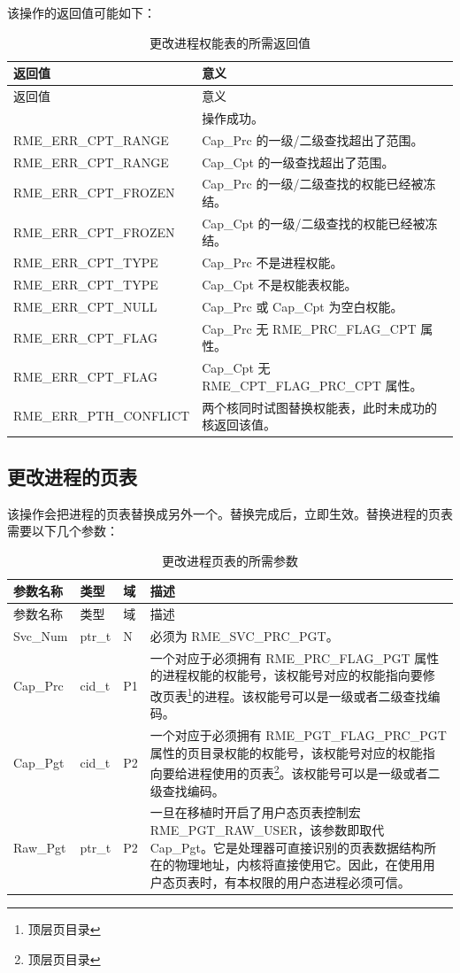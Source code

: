 该操作的返回值可能如下：

\begin{xltabular}{\textwidth}{@{}>{\hsize\raggedright\arraybackslash}X>{\hsize\raggedright\arraybackslash}X@{}}
\caption{更改进程权能表的所需返回值}\label{tab:4-15-change-process-capability-table-return-values}\\
\toprule
返回值 & 意义\tabularnewline
\endfirsthead
\toprule
返回值 & 意义\tabularnewline
\midrule
\endhead
\bottomrule
{} & 操作成功。\tabularnewline
    RME\_ERR\_CPT\_RANGE & Cap\_Prc 的一级/二级查找超出了范围。\tabularnewline
    RME\_ERR\_CPT\_RANGE & Cap\_Cpt 的一级查找超出了范围。\tabularnewline
    RME\_ERR\_CPT\_FROZEN & Cap\_Prc 的一级/二级查找的权能已经被冻结。\tabularnewline
    RME\_ERR\_CPT\_FROZEN & Cap\_Cpt 的一级/二级查找的权能已经被冻结。\tabularnewline
    RME\_ERR\_CPT\_TYPE & Cap\_Prc 不是进程权能。\tabularnewline
    RME\_ERR\_CPT\_TYPE & Cap\_Cpt 不是权能表权能。\tabularnewline
    RME\_ERR\_CPT\_NULL & Cap\_Prc 或 Cap\_Cpt 为空白权能。\tabularnewline
    RME\_ERR\_CPT\_FLAG & Cap\_Prc 无 RME\_PRC\_FLAG\_CPT 属性。\tabularnewline
    RME\_ERR\_CPT\_FLAG & Cap\_Cpt 无 RME\_CPT\_FLAG\_PRC\_CPT 属性。\tabularnewline
    RME\_ERR\_PTH\_CONFLICT & 两个核同时试图替换权能表，此时未成功的核返回该值。\tabularnewline
\end{xltabular}

\subsection{更改进程的页表}\label{subsec:4-change-process-page-table}

该操作会把进程的页表替换成另外一个。替换完成后，立即生效。替换进程的页表需要以下几个参数：

\begin{xltabular}{\textwidth}{@{}>{\hsize\raggedright\arraybackslash}X>{\hsize\raggedright\arraybackslash}X>{\hsize\raggedright\arraybackslash}X>{\hsize\raggedright\arraybackslash}X@{}}
\caption{更改进程页表的所需参数}\label{tab:4-16-change-process-page-table-parameters}\\
\toprule
参数名称 & 类型 & 域 & 描述\tabularnewline
\endfirsthead
\toprule
参数名称 & 类型 & 域 & 描述\tabularnewline
\midrule
\endhead
\bottomrule
\endlastfoot
Svc\_Num & ptr\_t & N & 必须为 RME\_SVC\_PRC\_PGT。\tabularnewline
Cap\_Prc & cid\_t & P1 &
一个对应于必须拥有 RME\_PRC\_FLAG\_PGT 属性的进程权能的权能号，该权能号对应的权能指向要修改页表\footnote{顶层页目录}的进程。该权能号可以是一级或者二级查找编码。\tabularnewline
Cap\_Pgt & cid\_t & P2 &
一个对应于必须拥有 RME\_PGT\_FLAG\_PRC\_PGT 属性的页目录权能的权能号，该权能号对应的权能指向要给进程使用的页表\footnote{顶层页目录}。该权能号可以是一级或者二级查找编码。\tabularnewline
Raw\_Pgt & ptr\_t & P2 &
一旦在移植时开启了用户态页表控制宏RME\_PGT\_RAW\_USER，该参数即取代Cap\_Pgt。它是处理器可直接识别的页表数据结构所在的物理地址，内核将直接使用它。因此，在使用用户态页表时，有本权限的用户态进程必须可信。\tabularnewline
\end{xltabular}

